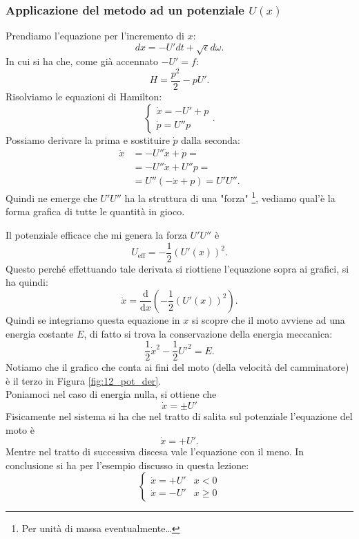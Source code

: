 \subsubsection{Applicazione del metodo ad un potenziale $U(x)$}%
\label{subsub:Applicazione del metodo ad un potenziale $U(x)$}
Prendiamo l'equazione per l'incremento di $x$:
\[
    dx = - U' dt + \sqrt{\epsilon} d\omega
.\] 
In cui si ha che, come già accennato $-U' = f$:
\[
    H = \frac{p^2}{2}-pU'
.\] 
Risolviamo le equazioni di Hamilton:
\[
    \begin{cases}
	\dot{x} = -U' + p\\
	\dot{p} = U''p
    \end{cases}
.\] 
Possiamo derivare la prima e sostituire $\dot{p}$ dalla seconda:
\[\begin{aligned}
    \ddot{x} &= -U'' \dot{x} + \dot{p} =\\
	      & = - U'' \dot{x} + U'' p = \\
	      & = U''\left(- \dot{x} + p\right) = U'U''
.\end{aligned}\]
Quindi ne emerge che $U'U''$ ha la struttura di una "forza"
\footnote{Per unità di massa eventualmente\ldots}, 
vediamo qual'è la forma grafica di tutte le quantità in gioco.

\noindent
Il potenziale efficace che mi genera la forza $U'U''$ è 
\[
    U_{\text{eff}} = -\frac{1}{2}\left(U'(x)\right)^2
.\] 
Questo perché effettuando tale derivata si riottiene l'equazione sopra ai grafici, si ha quindi:
\[
    \ddot{x} = \frac{\text{d} }{\text{d} x} \left(-\frac{1}{2}(U'(x) ) ^2\right)
.\] 
Quindi se integriamo questa equazione in $x$ si scopre che il moto avviene ad una energia costante $E$, di fatto si trova la conservazione della energia meccanica:
\[
    \frac{1}{2} \dot{x}^2 - \frac{1}{2} U'^2 = E
.\] 
Notiamo che il grafico che conta ai fini del moto (della velocità del camminatore) è il terzo in Figura \ref{fig:12_pot_der}.\\
Poniamoci nel caso di energia nulla, si ottiene che
\begin{equation}
    \dot{x} = \pm U'
    \label{eq:12_moto}
\end{equation}
Fisicamente nel sistema	si ha che nel tratto di salita sul potenziale l'equazione del moto è 
\[
    \dot{x} =  + U'
.\] 
Mentre nel tratto di successiva discesa vale l'equazione con il meno. In conclusione si ha per l'esempio discusso in questa lezione:
\[
    \begin{cases}
	\dot{x} = + U' & x<0\\
	\dot{x} = -U' & x\ge 0
    \end{cases}
\] 
